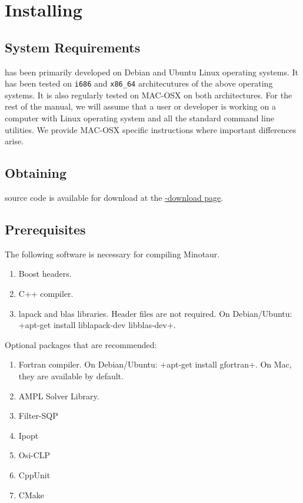 
\section{Installing \mntr}
\subsection{System Requirements}
\mntr{} has been primarily developed on Debian and Ubuntu Linux operating
systems. It has been tested on {\tt i686} and {\tt x86\_64} architecutures of
the above operating systems. It is also regularly tested on MAC-OSX on both
architectures. For the rest of the manual, we will assume that a user or
developer is working on a computer with Linux operating system and all the
standard command line utilities. We provide MAC-OSX specific
instructions where important differences arise.


\subsection{Obtaining \mntr}
\mntr{} source code is available for download at the 
\href{http://wiki.mcs.anl.gov/minotaur/index.php/Minotaur\_Download}{\mntr-download
page}.

\subsection{Prerequisites}
The following software is necessary for compiling Minotaur.
\begin{enumerate}
\item Boost headers.
\item C++ compiler.
\item lapack and blas libraries. Header files are not required.
On Debian/Ubuntu: \code+apt-get install liblapack-dev libblas-dev+.
\end{enumerate}
Optional packages that are recommended:
\begin{enumerate}
\item Fortran compiler. 
On Debian/Ubuntu: \code+apt-get install gfortran+.
On Mac, they are available by default.
\item AMPL Solver Library.
\item Filter-SQP
\item Ipopt
\item Osi-CLP
\item CppUnit
\item CMake
\end{enumerate}

